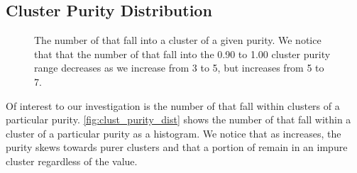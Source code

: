 \subsection{Cluster Purity Distribution}
\begin{figure}[ht!]
    \centering
    \hfill
    \hfill
    
    \caption{The number of \isols{} that fall into a cluster of a given purity. We notice that that the number of \isols{} that fall into the 0.90 to 1.00 cluster purity range decreases as we increase \minneigh{} from 3 to 5, but increases from 5 to 7.}
    \label{fig:clust_purity_dist}
\end{figure}

Of interest to our investigation is the number of \isols{} that fall within clusters of a particular purity. 
\autoref{fig:clust_purity_dist} shows the number of \isols{} that fall within a cluster of a particular purity as a histogram.
We notice that as \minneigh{} increases, the purity skews towards purer clusters and that a portion of \isols{} remain in an impure cluster regardless of the \minneigh{} value.

